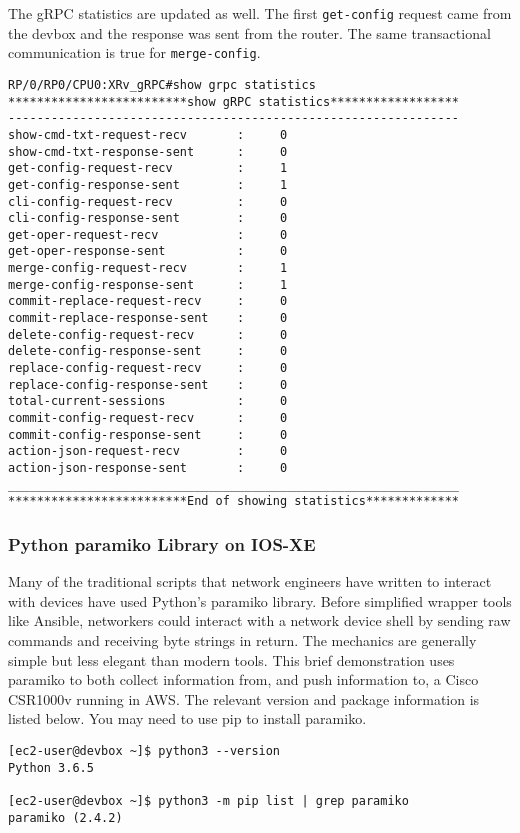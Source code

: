 The gRPC statistics are updated as well. The first \verb|get-config| request came
from the devbox and the response was sent from the router. The same
transactional communication is true for \verb|merge-config|.

\begin{verbatim}
RP/0/RP0/CPU0:XRv_gRPC#show grpc statistics 
*************************show gRPC statistics******************
---------------------------------------------------------------
show-cmd-txt-request-recv       :     0
show-cmd-txt-response-sent      :     0
get-config-request-recv         :     1
get-config-response-sent        :     1
cli-config-request-recv         :     0
cli-config-response-sent        :     0
get-oper-request-recv           :     0
get-oper-response-sent          :     0
merge-config-request-recv       :     1
merge-config-response-sent      :     1
commit-replace-request-recv     :     0
commit-replace-response-sent    :     0
delete-config-request-recv      :     0
delete-config-response-sent     :     0
replace-config-request-recv     :     0
replace-config-response-sent    :     0
total-current-sessions          :     0
commit-config-request-recv      :     0
commit-config-response-sent     :     0
action-json-request-recv        :     0
action-json-response-sent       :     0
_______________________________________________________________
*************************End of showing statistics*************
\end{verbatim}

\subsubsection{Python paramiko Library on IOS-XE}
Many of the traditional scripts that network engineers have written to
interact with devices have used Python's paramiko library. Before simplified
wrapper tools like Ansible, networkers could interact with a network device
shell by sending raw commands and receiving byte strings in return. The
mechanics are generally simple but less elegant than modern tools. This brief
demonstration uses paramiko to both collect information from, and push
information to, a Cisco CSR1000v running in AWS. The relevant version and
package information is listed below. You may need to use pip to install paramiko.

\begin{verbatim}
[ec2-user@devbox ~]$ python3 --version
Python 3.6.5

[ec2-user@devbox ~]$ python3 -m pip list | grep paramiko
paramiko (2.4.2)
\end{verbatim}

